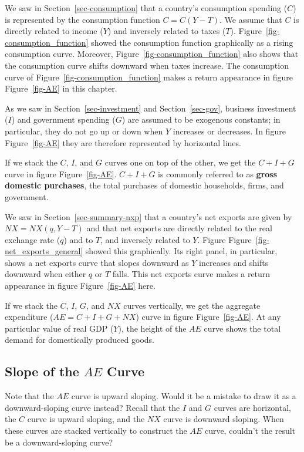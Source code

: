 \documentclass[
  letterpaper,
]{book}
\theoremstyle{plain}
\theoremstyle{remark}
\begin{document}
We saw in Section~\ref{sec-consumption} that a country's consumption
spending (\(C\)) is represented by the consumption function
\(C=C(Y-T)\). We assume that \(C\) is directly related to income (\(Y\))
and inversely related to taxes (\(T\)).
Figure~\ref{fig-consumption_function} showed the consumption function
graphically as a rising consumption curve. Moreover,
Figure~\ref{fig-consumption_function} also shows that the consumption
curve shifts downward when taxes increase. The consumption curve of
Figure~\ref{fig-consumption_function} makes a return appearance in
figure Figure~\ref{fig-AE} in this chapter.

As we saw in Section~\ref{sec-investment} and Section~\ref{sec-gov},
business investment (\(I\)) and government spending (\(G\)) are assumed
to be exogenous constants; in particular, they do not go up or down when
\(Y\) increases or decreases. In figure Figure~\ref{fig-AE} they are
therefore represented by horizontal lines.

If we stack the \(C\), \(I\), and \(G\) curves one on top of the other,
we get the \(C+I+G\) curve in figure Figure~\ref{fig-AE}. \(C+I+G\) is
commonly referred to as \textbf{gross domestic purchases}, the total
purchases of domestic households, firms, and government.

We saw in Section~\ref{sec-summary-nxp} that a country's net exports are
given by \(NX=NX(q,Y-T)\) and that net exports are directly related to
the real exchange rate (\(q\)) and to \(T\), and inversely related to
\(Y\). Figure Figure~\ref{fig-net_exports_general} showed this
graphically. Its right panel, in particular, shows a net exports curve
that slopes downward as \(Y\) increases and shifts downward when either
\(q\) or \(T\) falls. This net exports curve makes a return appearance
in figure Figure~\ref{fig-AE} here.

If we stack the \(C\), \(I\), \(G\), and \(NX\) curves vertically, we
get the aggregate expenditure (\(AE=C+I+G+NX\)) curve in figure
Figure~\ref{fig-AE}. At any particular value of real GDP (\(Y\)), the
height of the \(AE\) curve shows the total demand for domestically
produced goods.

\subsection{\texorpdfstring{Slope of the \texorpdfstring{$AE$}{AE}
Curve}{Slope of the  Curve}}\label{sec-aeslope}

Note that the \(AE\) curve is upward sloping. Would it be a mistake to
draw it as a downward-sloping curve instead? Recall that the \(I\) and
\(G\) curves are horizontal, the \(C\) curve is upward sloping, and the
\(NX\) curve is downward sloping. When these curves are stacked
vertically to construct the \(AE\) curve, couldn't the result be a
downward-sloping curve?
\end{document}
